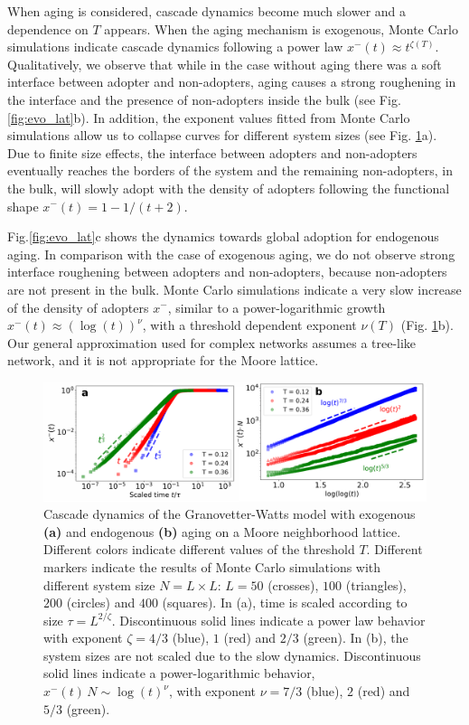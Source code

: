 When aging is considered, cascade dynamics become much slower and a dependence on $T$ appears. When the aging mechanism is exogenous, Monte Carlo simulations indicate cascade dynamics following a power law $x^{-}(t) \approx t^{\zeta(T)}$. Qualitatively, we observe that while in the case without aging there was a soft interface between adopter and non-adopters, aging causes a strong roughening in the interface and the presence of non-adopters inside the bulk (see Fig. \ref{fig:evo_lat}b). In addition, the exponent values fitted from Monte Carlo simulations allow us to collapse curves for different system sizes (see Fig. \ref{fig:lattice}a). Due to finite size effects, the interface between adopters and non-adopters eventually reaches the borders of the system and the remaining non-adopters, in the bulk, will slowly adopt with the density of adopters following the functional shape $x^{-}(t) = 1- 1/(t+2)$.

Fig.\ref{fig:evo_lat}c shows the dynamics towards global adoption for endogenous aging. In comparison with the case of exogenous aging, we do not observe strong interface roughening between adopters and non-adopters, because non-adopters are not present in the bulk. Monte Carlo simulations indicate a very slow increase of the density of adopters $x^{-}$, similar to a power-logarithmic growth  $x^{-}(t) \approx (\log(t))^{\nu}$, with a threshold dependent exponent $\nu(T)$  (Fig. \ref{fig:lattice}b). Our general approximation used for complex networks assumes a tree-like network, and it is not appropriate for the Moore lattice. 

\begin{figure}
    \centering \captionsetup{font=sf}
    \includegraphics[width=\columnwidth]{Figs/Aging_Threshold/FIGA.pdf}
    \caption[Cascade dynamics snapshots in a lattice]{\label{fig:lattice} Cascade dynamics of the Granovetter-Watts model with exogenous \textbf{(a)} and endogenous \textbf{(b)} aging on a Moore neighborhood lattice. Different colors indicate different values of the threshold $T$. Different markers indicate the results of Monte Carlo simulations with different system size $N = L \times L$:  $L = 50$ (crosses), $100$ (triangles), $200$ (circles) and $400$ (squares). In (a), time is scaled according to size $\tau = L^{2 / \zeta}$. Discontinuous solid lines indicate a power law behavior with exponent $ \zeta = 4/3$ (blue), $1$ (red) and $2/3$ (green). In (b), the system sizes are not scaled due to the slow dynamics. Discontinuous solid lines indicate a power-logarithmic behavior, $x^{-}(t) \, N \sim \log(t)^{\nu} $, with exponent $ \nu = 7/3$ (blue), $2$ (red) and $5/3$ (green).}
\end{figure}
    

